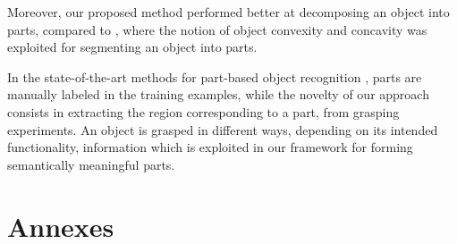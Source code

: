 \documentclass[a4paper,11pt,pdf]{pacmanreport}
\begin{document}
Moreover, our proposed method performed better at decomposing an object into 
parts, compared to \cite{rel7}, where the notion of object convexity and 
concavity was exploited for segmenting an object into parts.

In the state-of-the-art methods for part-based object recognition 
\cite{part2,part3,part1}, parts are manually labeled in the training examples, 
while the novelty of our approach consists in extracting the region 
corresponding to a part, from grasping experiments. An object is grasped in 
different ways, depending on its intended functionality, information which is 
exploited in our framework for forming semantically meaningful parts.

\newpage




\newpage

\appendix

\section{Annexes}

\end{document}
